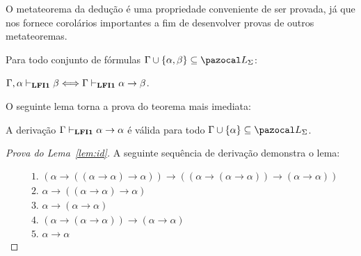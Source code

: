     O metateorema da dedução é uma propriedade conveniente de ser provada, já que nos fornece corolários importantes a fim de desenvolver provas de outros metateoremas.
    
    \begin{teorema}\label{teo:deducao}
        Para todo conjunto de fórmulas $\Gamma \cup \{\alpha, \beta \} \subseteq \ling{}$:

        \centering
        {\normalfont{} $\Gamma, \alpha \vdash_{{\normalfont\textbf{LFI1}}{}} \beta \Longleftrightarrow \Gamma \vdash_{{\normalfont\textbf{LFI1}}{}} \alpha \to \beta$.}
    \end{teorema}

    O seguinte lema torna a prova do teorema mais imediata:
    \begin{lema}\label{lem:id}
        A derivação $\Gamma \vdash_{{\normalfont\textbf{LFI1}}{}} \alpha \to \alpha$ é válida para todo $\Gamma \cup \{\alpha\} \subseteq \ling{}$.
    \end{lema}
    
    \begin{proof}[Prova do Lema~\ref{lem:id}]
        A seguinte sequência de derivação demonstra o lema:
        
        \begin{align*}
            & \text{1. } (\alpha \to ((\alpha \to \alpha) \to \alpha)) \to ((\alpha \to (\alpha \to \alpha)) \to (\alpha \to \alpha))\tag{Ax2}\\
            & \text{2. } \alpha \to ((\alpha \to \alpha) \to \alpha)\tag{Ax1}\\
            & \text{3. } \alpha \to (\alpha \to \alpha)\tag{Ax1}\\
            & \text{4. } (\alpha \to (\alpha \to \alpha)) \to (\alpha \to \alpha)\tag{MP 1,2}\\
            & \text{5. } \alpha \to \alpha\tag{MP 3,4}
        \end{align*}
    \end{proof}

